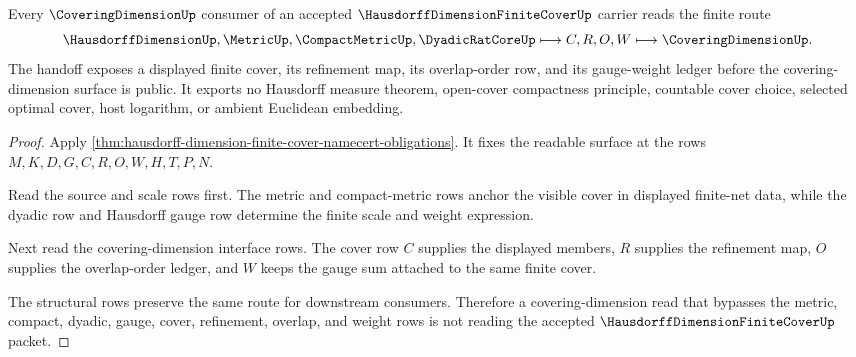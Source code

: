 \begin{theorem}
\label{thm:hausdorff-dimension-covering-dimension-handoff}
Every $\CoveringDimensionUp$ consumer of an accepted $\HausdorffDimensionFiniteCoverUp$ carrier reads the finite route
$$
\HausdorffDimensionUp,\MetricUp,\CompactMetricUp,\DyadicRatCoreUp \longmapsto C,R,O,W \longmapsto \CoveringDimensionUp .
$$
The handoff exposes a displayed finite cover, its refinement map, its overlap-order row, and its gauge-weight ledger before the covering-dimension surface is public. It exports no Hausdorff measure theorem, open-cover compactness principle, countable cover choice, selected optimal cover, host logarithm, or ambient Euclidean embedding.
\end{theorem}
\begin{proof}
Apply \autoref{thm:hausdorff-dimension-finite-cover-namecert-obligations}. It fixes the readable surface at the rows $M,K,D,G,C,R,O,W,H,T,P,N$.

Read the source and scale rows first. The metric and compact-metric rows anchor the visible cover in displayed finite-net data, while the dyadic row and Hausdorff gauge row determine the finite scale and weight expression.

Next read the covering-dimension interface rows. The cover row $C$ supplies the displayed members, $R$ supplies the refinement map, $O$ supplies the overlap-order ledger, and $W$ keeps the gauge sum attached to the same finite cover.

The structural rows preserve the same route for downstream consumers. Therefore a covering-dimension read that bypasses the metric, compact, dyadic, gauge, cover, refinement, overlap, and weight rows is not reading the accepted $\HausdorffDimensionFiniteCoverUp$ packet.
\end{proof}



